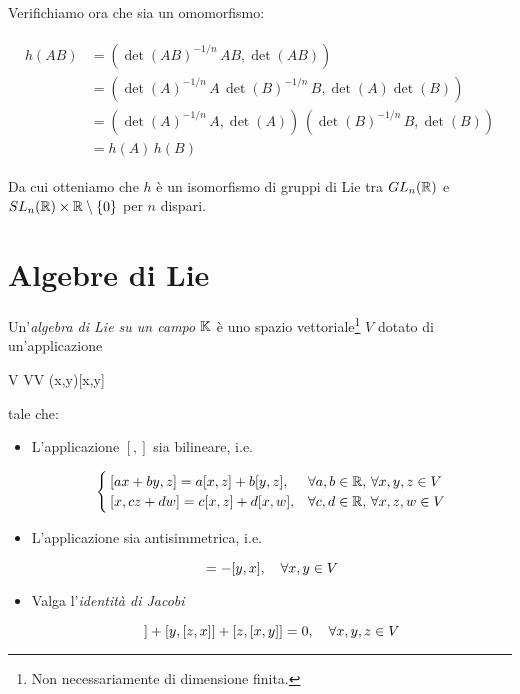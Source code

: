 Verifichiamo ora che sia un omomorfismo:

\begin{align}
	\begin{split}
		h(A B) &= \left( \det(A B)^{-1/n} \, A B, \det(A B) \right) \\
		&= \left( \det(A)^{-1/n} \, A \, \det(B)^{-1/n} \, B, \det(A) \det(B) \right) \\
		&= \left( \det(A)^{-1/n} \, A, \det(A) \right) \, \left( \det(B)^{-1/n} \, B, \det(B) \right) \\
		&= h(A) \, h(B)
	\end{split}
\end{align}

Da cui otteniamo che $ h $ è un isomorfismo di gruppi di Lie tra $ GL_{n}(\mathbb{R}) $ e $ SL_{n}(\mathbb{R}) \times \mathbb{R} \setminus \{0\} $ per $ n $ dispari.

\section{Algebre di Lie}

Un'\textit{algebra di Lie su un campo} $ \mathbb{K} $ è uno spazio vettoriale\footnote{%
	Non necessariamente di dimensione finita.%
} $ V $ dotato di un'applicazione

\map{[,]}
	{V \times V}{V}
	{(x,y)}{[x,y]}

tale che:

\begin{itemize}
	\item L'applicazione $ [,] $ sia bilineare, i.e.
	
	\begin{equation}
		\begin{cases}
			[ax+by,z] = a[x,z] + b[y,z], & \forall a,b \in \mathbb{R}, \, \forall x,y,z \in V \\
			[x,cz+dw] = c[x,z] + d[x,w], & \forall c,d \in \mathbb{R}, \, \forall x,z,w \in V
		\end{cases}
	\end{equation}
	
	\item L'applicazione sia antisimmetrica, i.e.
	
	\begin{equation}
		[x,y] = -[y,x] \qcomma \forall x,y \in V
	\end{equation}
	
	\item Valga l'\textit{identità di Jacobi}
	
	\begin{equation}
		[x,[y,z]] + [y,[z,x]] + [z,[x,y]] = 0 \qcomma \forall x,y,z \in V
	\end{equation}
\end{itemize}

